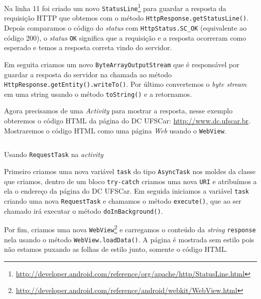 \documentclass[a4paper,12pt,brazil]{book}
\begin{document}
\begin{singlespace}
		Na linha 11 foi criado um novo \texttt{StatusLine}\footnote{\href{http://developer.android.com/reference/org/apache/http/StatusLine.html}{http://developer.android.com/reference/org/apache/http/StatusLine.html}} para guardar a resposta da requisição HTTP que obtemos com o método \texttt{HttpResponse.getStatusLine()}. Depois comparamos o código do \emph{status} com \texttt{HttpStatus.SC\_OK} (equivalente ao código 200), o \emph{status} \texttt{OK} significa que a requisição e a resposta ocorreram como esperado e temos a resposta correta vindo do servidor. 

		Em seguita criamos um novo \texttt{ByteArrayOutputStream} que é responsável por guardar a resposta do servidor na chamada ao método \texttt{HttpResponse.getEntity().writeTo()}. Por último convertemos o \emph{byte stream} em uma string usando o método \texttt{toString()} e a retornamos.

		Agora precisamos de uma \emph{Activity} para mostrar a resposta, nesse exemplo obteremos o código HTML da página do DC UFSCar: \href{http://www.dc.ufscar.br}{http://www.dc.ufscar.br}. Mostraremos o código HTML como uma página \emph{Web} usando o \texttt{WebView}.

		\begin{listing}[H]
		\inputminted[linenos=true,fontsize=\small,frame=lines, framesep=2mm, tabsize=2,numbersep=5pt]{java}{src/api/comm/httpget.java}
		\caption{Usando \texttt{RequestTask} na \emph{activity}}
		\label{code:requestactivity}
		\end{listing}		

		Primeiro criamos uma nova variável \texttt{task} do tipo \texttt{AsyncTask} nos moldes da classe que criamos, dentro de um bloco \texttt{try-catch} criamos uma nova \texttt{URI} e atribuímos a ela o endereço da página do DC UFSCar. Em seguida iniciamos a variável \texttt{task} criando uma nova \texttt{RequestTask} e chamamos o método \texttt{execute()}, que ao ser chamado irá executar o método \texttt{doInBackground()}. 
		
		Por fim, criamos uma nova \texttt{WebView}\footnote{\href{http://developer.android.com/reference/android/webkit/WebView.html}{http://developer.android.com/reference/android/webkit/WebView.html}} e carregamos o conteúdo da \emph{string} \texttt{response} nela usando o método \texttt{WebView.loadData()}. A página é mostrada sem estilo pois não estamos puxando as folhas de estilo junto, somente o código HTML.
		


\end{singlespace}
\end{document}
